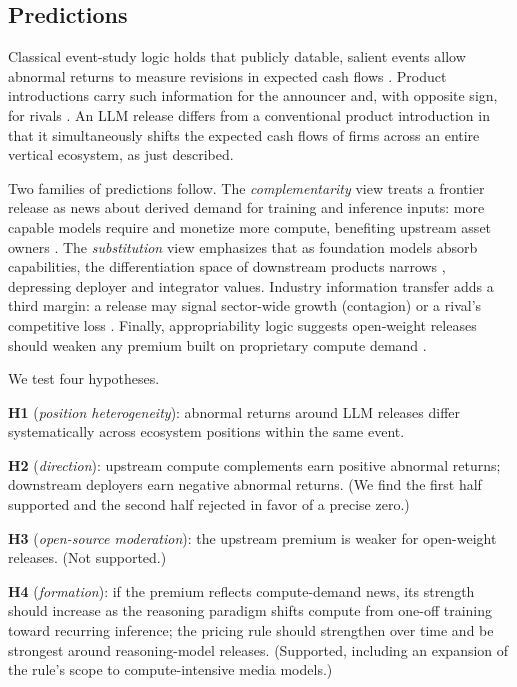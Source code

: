 \documentclass[review,12pt,authoryear]{elsarticle}
\begin{document}
\subsection{Predictions}

Classical event-study logic holds that publicly datable, salient events allow
abnormal returns to measure revisions in expected cash flows
\citep{fama1969,brown1985,mackinlay1997,kothari2007}. Product introductions
carry such information for the announcer and, with opposite sign, for rivals
\citep{chaney1991,hendricks1997,chen2005,sorescu2007}. An LLM release differs
from a conventional product introduction in that it simultaneously shifts the
expected cash flows of firms across an entire vertical ecosystem, as just
described.

Two families of predictions follow. The \emph{complementarity} view treats a
frontier release as news about derived demand for training and inference
inputs: more capable models require and monetize more compute, benefiting
upstream asset owners \citep{acemoglu2012,gofman2020}. The
\emph{substitution} view emphasizes that as foundation models absorb
capabilities, the differentiation space of downstream products narrows
\citep{bommasani2021,zhu2018}, depressing deployer and integrator values.
Industry information transfer adds a third margin: a release may signal
sector-wide growth (contagion) or a rival's competitive loss
\citep{lang1992}. Finally, appropriability logic suggests open-weight releases
should weaken any premium built on proprietary compute demand
\citep{teece1986,lerner2002,solaiman2023}.

We test four hypotheses.

\textbf{H1} (\emph{position heterogeneity}): abnormal returns around LLM
releases differ systematically across ecosystem positions within the same
event.

\textbf{H2} (\emph{direction}): upstream compute complements earn positive
abnormal returns; downstream deployers earn negative abnormal returns. (We
find the first half supported and the second half rejected in favor of a
precise zero.)

\textbf{H3} (\emph{open-source moderation}): the upstream premium is weaker
for open-weight releases. (Not supported.)

\textbf{H4} (\emph{formation}): if the premium reflects compute-demand news,
its strength should increase as the reasoning paradigm shifts compute from
one-off training toward recurring inference; the pricing rule should
strengthen over time and be strongest around reasoning-model releases.
(Supported, including an expansion of the rule's scope to compute-intensive
media models.)
\end{document}
